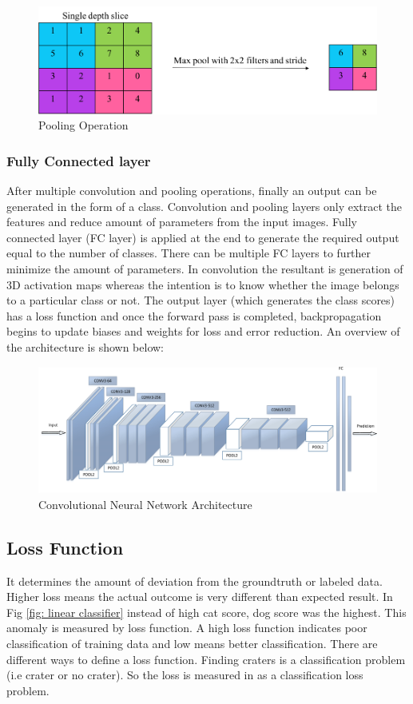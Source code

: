 \documentclass[11pt]{article}
\begin{document}
\begin{figure}[H]
	\centering
	\includegraphics[width=.6\linewidth]{files/cnn_architecture/pooling.png}
	\caption{Pooling Operation}
	\label{fig:Pooling Operation}
\end{figure}

\subsubsection{Fully Connected layer}
After multiple convolution and pooling operations, finally an output can be generated in the form of a class. Convolution and pooling layers only extract the features and reduce amount of parameters from the input images. Fully connected layer (FC layer) is applied at the end to generate the required output equal to the number of classes. There can be multiple FC layers to further minimize the amount of parameters. In convolution the resultant is generation of 3D activation maps whereas the intention is to know whether the image belongs to a particular class or not. The output layer (which generates the class scores) has a loss function and once the forward pass is completed, backpropagation begins to update biases and weights for loss and error reduction. An overview of the architecture is shown below:

\begin{figure}[H]
	\centering
	\includegraphics[width=.6\linewidth]{files/cnn_architecture/arch.png}
	\caption{Convolutional Neural Network Architecture \cite{2016face}}
	\label{fig: CNN architecture}
\end{figure}

\subsection{Loss Function}
It determines the amount of deviation from the groundtruth or labeled data. Higher loss means the actual outcome is very different than expected result. In Fig \ref{fig: linear classifier} instead of high cat score, dog score was the highest. This anomaly is measured by loss function. A high loss function indicates poor classification of training data and low means better classification. There are different ways to define a loss function. Finding craters is a classification problem (i.e crater or no crater). So the loss is measured in as a classification loss problem.
\end{document}
